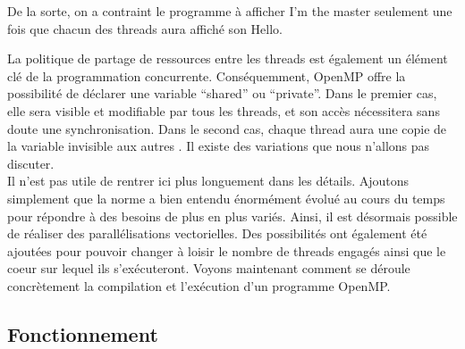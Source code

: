 \documentclass{report}
\begin{document}
De la sorte, on a contraint le programme à afficher I'm the master seulement une fois que chacun 
des threads aura affiché son Hello.

La politique de partage de ressources entre les threads est également un élément clé de la programmation
concurrente. Conséquemment, OpenMP offre la possibilité de déclarer une variable ``shared'' ou 
``private''. 
Dans le premier cas, elle sera visible et modifiable par tous les threads, et son accès nécessitera sans
doute une synchronisation. Dans le second cas, chaque thread aura une copie de la variable invisible aux 
autres \cite{ompmem}. Il existe des variations que nous n'allons pas discuter.
\\Il n'est pas utile de rentrer ici plus longuement dans les détails. Ajoutons simplement que la
norme a bien entendu énormément évolué au cours du temps pour répondre à des besoins de plus en plus
variés. Ainsi, il est désormais possible de réaliser des parallélisations vectorielles. Des possibilités
ont également été ajoutées pour pouvoir changer à loisir le nombre de threads engagés ainsi que le coeur 
sur lequel ils s'exécuteront. Voyons maintenant comment se déroule concrètement la compilation et
l'exécution d'un programme OpenMP.

\subsection{Fonctionnement}
\end{document}
